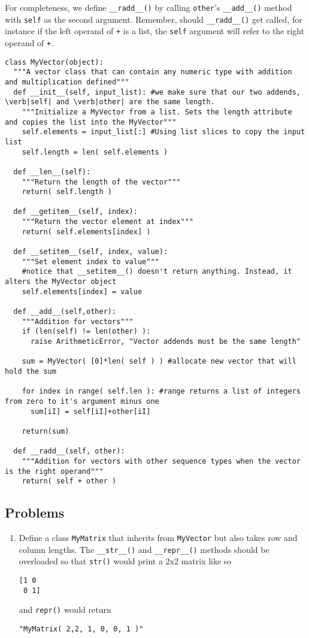 For completeness, we define \verb|__radd__()| by calling \verb|other|'s \verb|__add__()| method with  \verb|self| as the second argument. Remember, should \verb|__radd__()| get called, for instance if the left operand of \verb|+| is a list, the \verb|self| argument will refer to the right operand of \verb|+|.

\begin{lstlisting}[caption=MyVector class,
  label=myvector,
  float=h!]
class MyVector(object):
  """A vector class that can contain any numeric type with addition and multiplication defined"""
  def __init__(self, input_list): #we make sure that our two addends, \verb|self| and \verb|other| are the same length. 
    """Initialize a MyVector from a list. Sets the length attribute and copies the list into the MyVector"""
    self.elements = input_list[:] #Using list slices to copy the input list
    self.length = len( self.elements )

  def __len__(self):
    """Return the length of the vector"""
    return( self.length )

  def __getitem__(self, index):
    """Return the vector element at index"""
    return( self.elements[index] )

  def __setitem__(self, index, value):
    """Set element index to value"""
    #notice that __setitem__() doesn't return anything. Instead, it alters the MyVector object
    self.elements[index] = value

  def __add__(self,other):
    """Addition for vectors"""
    if (len(self) != len(other) ):
      raise ArithmeticError, "Vector addends must be the same length"

    sum = MyVector( [0]*len( self ) ) #allocate new vector that will hold the sum

    for index in range( self.len ): #range returns a list of integers from zero to it's argument minus one
      sum[iI] = self[iI]+other[iI]

    return(sum)

  def __radd__(self, other):
    """Addition for vectors with other sequence types when the vector is the right operand"""
    return( self + other )
\end{lstlisting}

\subsection{Problems}

\begin{enumerate}

	\item Define a class \verb|MyMatrix| that inherits from \verb|MyVector| but also takes row and column lengths. The \verb|__str__()| and \verb|__repr__()| methods should be overloaded so that \verb|str()| would print a 2x2 matrix like so

\begin{verbatim}
[1 0
 0 1]
\end{verbatim}

and \verb|repr()| would return

\verb|"MyMatrix( 2,2, 1, 0, 0, 1 )"|

\end{enumerate}

